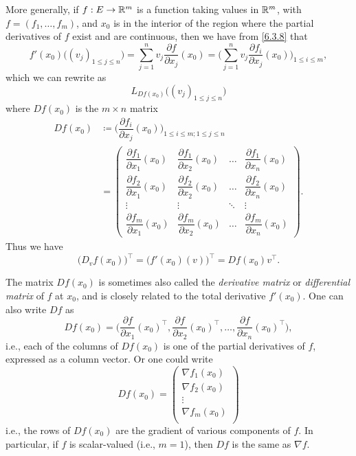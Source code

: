 \begin{ac}\label{ac:6.3.4}
  More generally, if \(f : E \to \mathbb{R}^m\) is a function taking values in \(\mathbb{R}^m\), with \(f = (f_1, \dots, f_m)\), and \(x_0\) is in the interior of the region where the partial derivatives of \(f\) exist and are continuous, then we have from \cref{6.3.8} that
  \[
    f'(x_0)\big((v_j)_{1 \leq j \leq n}\big) = \sum_{j = 1}^n v_j \dfrac{\partial f}{\partial x_j}(x_0) = \bigg(\sum_{j = 1}^n v_j \dfrac{\partial f_i}{\partial x_j}(x_0)\bigg)_{1 \leq i \leq m},
  \]
  which we can rewrite as
  \[
    L_{D f(x_0)}\big((v_j)_{1 \leq j \leq n}\big)
  \]
  where \(D f(x_0)\) is the \(m \times n\) matrix
  \begin{align*}
    D f(x_0) & \coloneqq \bigg(\dfrac{\partial f_i}{\partial x_j}(x_0)\bigg)_{1 \leq i \leq m ; 1 \leq j \leq n}                                      \\
             & = \begin{pmatrix}
                   \dfrac{\partial f_1}{\partial x_1}(x_0) & \dfrac{\partial f_1}{\partial x_2}(x_0) & \dots  & \dfrac{\partial f_1}{\partial x_n}(x_0) \\
                   \dfrac{\partial f_2}{\partial x_1}(x_0) & \dfrac{\partial f_2}{\partial x_2}(x_0) & \dots  & \dfrac{\partial f_2}{\partial x_n}(x_0) \\
                   \vdots                                  & \vdots                                  & \ddots & \vdots                                  \\
                   \dfrac{\partial f_m}{\partial x_1}(x_0) & \dfrac{\partial f_m}{\partial x_2}(x_0) & \dots  & \dfrac{\partial f_m}{\partial x_n}(x_0)
                 \end{pmatrix}.
  \end{align*}
  Thus we have
  \[
    \big(D_v f(x_0)\big)^\top = \big(f'(x_0)(v)\big)^\top = D f(x_0) v^\top.
  \]

  The matrix \(D f(x_0)\) is sometimes also called the \emph{derivative matrix} or \emph{differential matrix} of \(f\) at \(x_0\), and is closely related to the total derivative \(f'(x_0)\).
  One can also write \(Df\) as
  \[
    D f(x_0) = \bigg(\dfrac{\partial f}{\partial x_1}(x_0)^\top, \dfrac{\partial f}{\partial x_2}(x_0)^\top, \dots, \dfrac{\partial f}{\partial x_n}(x_0)^\top\bigg),
  \]
  i.e., each of the columns of \(D f(x_0)\) is one of the partial derivatives of \(f\), expressed as a column vector.
  Or one could write
  \[
    D f(x_0) = \begin{pmatrix}
      \nabla f_1(x_0) \\
      \nabla f_2(x_0) \\
      \vdots          \\
      \nabla f_m(x_0) \\
    \end{pmatrix}
  \]
  i.e., the rows of \(D f(x_0)\) are the gradient of various components of \(f\).
  In particular, if \(f\) is scalar-valued (i.e., \(m = 1\)), then \(Df\) is the same as \(\nabla f\).
\end{ac}

